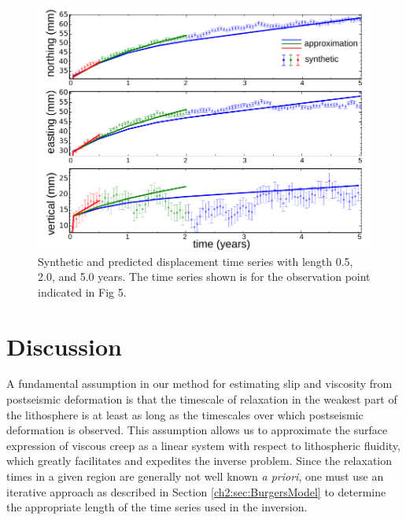 \begin{figure}
\includegraphics{ch2/figures/Fig10.pdf}
\caption{Synthetic and predicted displacement time series with
length 0.5, 2.0, and 5.0 years.  The time series shown is for the
observation point indicated in Fig 5.}
\label{ch2:fig:10}
\end{figure}

\section{Discussion}
A fundamental assumption in our method for estimating slip and
viscosity from postseismic deformation is that the timescale of
relaxation in the weakest part of the lithosphere is at least as long
as the timescales over which postseismic deformation is observed. This
assumption allows us to approximate the surface expression of viscous
creep as a linear system with respect to lithospheric fluidity, which
greatly facilitates and expedites the inverse problem. Since the
relaxation times in a given region are generally not well known
\textit{a priori}, one must use an iterative approach as described in
Section \ref{ch2:sec:BurgersModel} to determine the appropriate length
of the time series used in the inversion.

